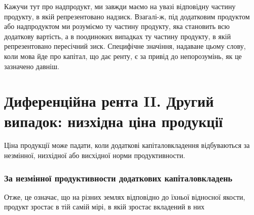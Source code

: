Кажучи тут про надпродукт, ми завжди маємо на увазі відповідну
частину продукту, в якій репрезентовано надзиск. Взагалі-ж, під додатковим
продуктом або надпродуктом ми розуміємо ту частину продукту, яка становить
всю додаткову вартість, а в поодиноких випадках ту частину продукту, в якій
репрезентовано пересічний зиск. Специфічне значіння, надаване цьому слову,
коли мова йде про капітал, що дає ренту, є за привід до непорозумінь, як це
зазначено давніш.

\section{Диференційна рента II. \textendash{} Другий випадок: низхідна ціна продукції}

Ціна продукції може падати, коли додаткові капіталовкладення відбуваються
за незмінної, низхідної або висхідної норми продуктивности.

\subsubsection{За незмінної продуктивности додаткових капіталовкладень}

Отже, це означає, що на різних землях відповідно до їхньої відносної
якости, продукт зростає в тій самій мірі, в якій зростає вкладений в них
\parbreak{}  %
